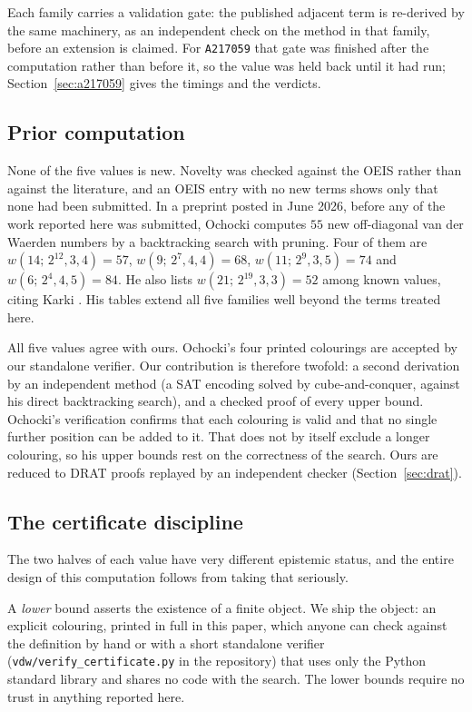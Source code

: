 \documentclass[12pt]{article}
\theoremstyle{remark}
\newcommand{\seq}[1]{\texttt{#1}}
\begin{document}
Each family carries a validation gate: the published adjacent term is
re-derived by the same machinery, as an independent check on the method in
that family, before an extension is claimed. For \seq{A217059} that gate was
finished after the computation rather than before it, so the value was held
back until it had run; Section~\ref{sec:a217059} gives the timings and the
verdicts.

\subsection{Prior computation}\label{sec:prior}

None of the five values is new. Novelty was checked against the OEIS rather
than against the literature, and an OEIS entry with no new terms shows only
that none had been submitted. In a preprint posted in June 2026, before any of
the work reported here was submitted, Ochocki \cite{ochocki} computes $55$ new
off-diagonal van der Waerden numbers by a backtracking search with pruning.
Four of them are $w(14;\,2^{12},3,4)=57$, $w(9;\,2^{7},4,4)=68$,
$w(11;\,2^{9},3,5)=74$ and $w(6;\,2^{4},4,5)=84$. He also lists
$w(21;\,2^{19},3,3)=52$ among known values, citing Karki \cite{karki}. His
tables extend all five families well beyond the terms treated here.

All five values agree with ours. Ochocki's four printed colourings are
accepted by our standalone verifier. Our contribution is therefore twofold:
a second derivation by an independent method (a SAT encoding solved by
cube-and-conquer, against his direct backtracking search), and a checked
proof of every upper bound. Ochocki's verification confirms that each
colouring is valid and that no single further position can be added to it.
That does not by itself exclude a longer colouring, so his upper bounds rest
on the correctness of the search. Ours are reduced to DRAT proofs replayed by
an independent checker (Section~\ref{sec:drat}).

\subsection{The certificate discipline}

The two halves of each value have very different epistemic status, and the
entire design of this computation follows from taking that seriously.

A \emph{lower} bound asserts the existence of a finite object. We ship the
object: an explicit colouring, printed in full in this paper, which anyone
can check against the definition by hand or with a short standalone verifier
(\texttt{vdw/verify\_certificate.py} in the repository) that uses only the
Python standard library and shares no code with the search. The lower bounds
require no trust in anything reported here.
\end{document}
